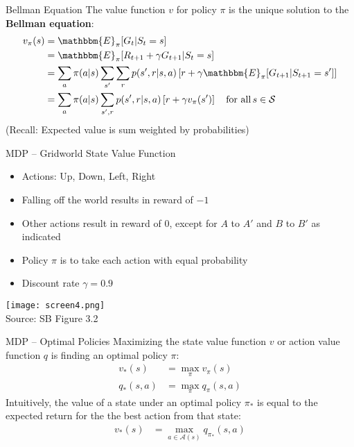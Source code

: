 \documentclass[ignorenonframetext,xcolor=x11names]{beamer}
\begin{document}
\begin{frame}{Bellman Equation}
The value function $v$ for policy $\pi$ is the unique solution to the \textbf{Bellman equation}:
\begin{align*}
v_\pi(s) &= \mathbbm{E}_\pi [ G_t | S_t = s] \\
&= \mathbbm{E}_\pi [R_{t+1} + \gamma G_{t+1} | S_t = s] \\
&= \sum_a \pi(a | s) \sum_{s'} \sum_r p(s', r | s, a) \left[ r + \gamma \mathbbm{E}_\pi [ G_{t+1} | S_{t+1} = s'] \right] \\
&= \sum_a \pi(a | s) \sum_{s', r} p(s', r | s, a) \left[r + \gamma v_\pi(s') \right] \quad \text{for all} \, s \in \mathcal{S}
\end{align*}
\centering
\footnotesize{(Recall: Expected value is sum weighted by probabilities)}
\end{frame}

\begin{frame}{MDP -- Gridworld State Value Function}
\begin{itemize}
   \item Actions: Up, Down, Left, Right
   \item Falling off the world results in reward of $-1$ 
   \item Other actions result in reward of $0$, except for $A$ to $A'$ and $B$ to $B'$ as indicated
   \item Policy $\pi$ is to take each action with equal probability
   \item Discount rate $\gamma = 0.9$
\end{itemize}
\begin{center}
\texttt{[image: screen4.png]} \\

\scriptsize Source: SB Figure 3.2 \normalsize
\end{center}
\end{frame}

\begin{frame}{MDP -- Optimal Policies}
Maximizing the state value function $v$ or action value function $q$ is finding an optimal policy $\pi$:
\begin{align*}
v_*(s) &= \operatorname*{max}_\pi v_\pi(s) \\
q_*(s, a) &= \operatorname*{max}_\pi q_\pi(s, a)
\end{align*}
Intuitively, the value of a state under an optimal policy $\pi_*$ is equal to the expected return for the the best action from that state:
\begin{align*}
v_*(s) &= \max_{a \in \mathcal{A}(s)} q_{\pi_*} (s, a) \\
\end{align*}
\end{frame}
\end{document}
